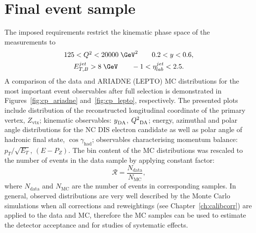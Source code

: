 \section{Final event sample}
\label{sec:eventsampletab}
The imposed requirements restrict the kinematic phase space of the measurements to
\begin{gather}
125 < \qsq < 20000\;\GeV^2 \qquad 0.2 < y < 0.6, \\
\etjetb > 8\;\GeV \qquad -1 < \etajetlab < 2.5.
\end{gather}
A comparison of the data and ARIADNE (LEPTO) MC distributions for the most important event observables after full selection is demonstrated in Figures~\ref{fig:cp_ariadne} and~\ref{fig:cp_lepto}, respectively. The presented plots include distribution of the reconstructed longitudinal coordinate of the primary vertex, $Z_\text{vtx}$; kinematic observables: $\mbox{${y}$}_\text{DA}$, $\mbox{${Q^2}$}_\text{DA}$; energy, azimuthal and polar angle distributions for the NC DIS electron candidate as well as polar angle of hadronic final state, $\cos{\gamma_\text{had}}$; observables characterising momentum balance: $p_T/\sqrt{E_T}$, $\left(E-P_Z\right)$. The bin content of the MC distributions was rescaled to the number of events in the data sample by applying constant factor:
\begin{equation}
\mathcal{R} = \frac{N_\text{data}}{N_\text{MC}},
\label{eq:mcrescale}
\end{equation}
where $N_\text{data}$ and $N_\text{MC}$ are the number of events in corresponding samples. In general, observed distributions are very well described by the Monte Carlo simulations when all corrections and reweightings (see Chapter~\ref{ch:calibcorr}) are applied to the data and MC, therefore the MC samples can be used to estimate the detector acceptance and for studies of systematic effects.



